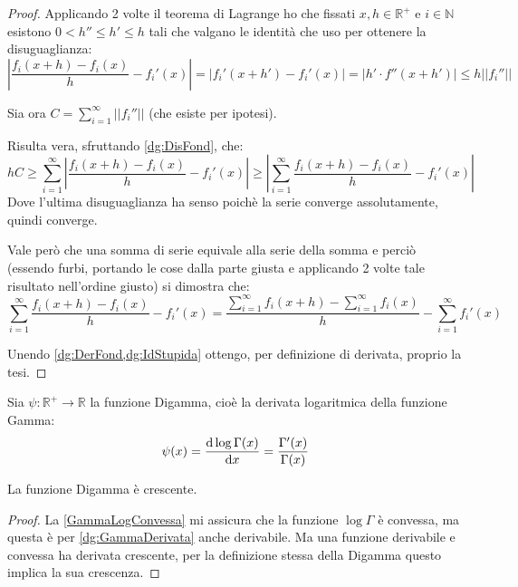 \begin{proof}
	Applicando 2 volte il teorema di Lagrange ho che fissati $x,h\in\mathbb{R^+}$ e $i\in\mathbb{N}$
	esistono $0<h''\le h'\le h$ tali che valgano le identità che uso per ottenere la disuguaglianza:
	\begin{equation}\label{dg:DisFond}
		\left\lvert\frac{f_i(x+h)-f_i(x)}h - f_i'(x)\right\rvert=\left\lvert f_i'(x+h') - f_i'(x)\right\rvert
		=\left\lvert h'\cdot f''(x+h') \right\rvert\le h||f_i''||
	\end{equation}
	
	Sia ora $C=\sum_{i=1}^{\infty} ||f_i''||$ (che esiste per ipotesi).
	
	Risulta vera, sfruttando \cref{dg:DisFond}, che:
	\begin{equation}\label{dg:DerFond}
		hC\ge \sum_{i=1}^{\infty}\left\lvert\frac{f_i(x+h)-f_i(x)}h - f_i'(x)\right\rvert \ge
		\left\lvert\sum_{i=1}^{\infty}\frac{f_i(x+h)-f_i(x)}h - f_i'(x)\right\rvert
	\end{equation}
	Dove l'ultima disuguaglianza ha senso poichè la serie converge assolutamente, quindi converge.
	
	Vale però che una somma di serie equivale alla serie della somma e perciò
	(essendo furbi, portando le cose dalla parte giusta e applicando 2 volte tale risultato nell'ordine giusto)
	si dimostra che:
	\begin{equation}\label{dg:IdStupida}
		\sum_{i=1}^{\infty}\frac{f_i(x+h)-f_i(x)}h - f_i'(x)=
		\frac{\sum_{i=1}^{\infty} f_i(x+h)- \sum_{i=1}^{\infty}f_i(x)}h -\sum_{i=1}^{\infty}f_i'(x)
	\end{equation}

	Unendo \cref{dg:DerFond,dg:IdStupida} ottengo, per definizione di derivata, proprio la tesi.
\end{proof}

\begin{definition}\label{dg:Digamma}
	Sia $\psi:\mathbb{R^+}\to\mathbb{R}$ la funzione Digamma, cioè la derivata logaritmica della funzione Gamma:
	\begin{equation*}
		\psi(x)=\frac{\mathrm{d} \log\Gamma(x)}{\mathrm{d} x}=\frac{\Gamma'(x)}{\Gamma(x)}
	\end{equation*}
\end{definition}

\begin{lemma}\label{dg:DigammaCresc}
	La funzione Digamma è crescente.
\end{lemma}
\begin{proof}
	La \cref{GammaLogConvessa} mi assicura che la funzione $\log\Gamma$ è convessa, ma questa è per \cref{dg:GammaDerivata}
	anche derivabile. Ma una funzione derivabile e convessa ha derivata crescente, per la definizione stessa della Digamma
	questo implica la sua crescenza.
\end{proof}

